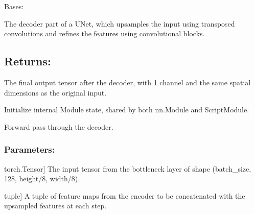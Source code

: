 \documentclass[a4paper,10pt,english]{sphinxmanual}
\begin{document}
\begin{fulllineitems}
\label{\detokenize{models:fireDiff.Models.unet.Decoder}}
\pysigstartsignatures
{}
\pysigstopsignatures
\sphinxAtStartPar
Bases: 

\sphinxAtStartPar
The decoder part of a U\sphinxhyphen{}Net, which upsamples the input using transposed
convolutions and refines the features using convolutional blocks.


\subsection{Returns:}
\label{\detokenize{models:id7}}\begin{description}
\sphinxAtStartPar
The final output tensor after the decoder, with 1 channel and the
same spatial dimensions as the original input.

\end{description}

\sphinxAtStartPar
Initialize internal Module state, shared by both nn.Module and ScriptModule.

\begin{fulllineitems}
\label{\detokenize{models:fireDiff.Models.unet.Decoder.forward}}
\pysigstartsignatures
{}
\pysigstopsignatures
\sphinxAtStartPar
Forward pass through the decoder.


\subsubsection{Parameters:}
\label{\detokenize{models:id8}}\begin{description}
\sphinxlineitem{x}{[}torch.Tensor{]}
\sphinxAtStartPar
The input tensor from the bottleneck layer of shape
(batch\_size, 128, height/8, width/8).

\sphinxlineitem{enc\_features}{[}tuple{]}
\sphinxAtStartPar
A tuple of feature maps from the encoder to be concatenated
with the upsampled features at each step.

\end{description}



\end{fulllineitems}
\end{fulllineitems}
\end{document}
